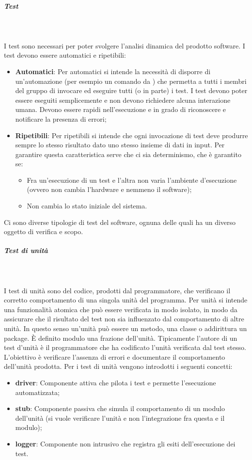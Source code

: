 \subparagraph{Test} \mbox{}\\ \\
I test sono necessari per poter svolgere l'analisi dinamica del prodotto software.
I test devono essere automatici e ripetibili:
\begin{itemize}
\item \textbf{Automatici}: Per automatici si intende la necessità di disporre di un'automazione (per esempio un comando da ) che permetta a tutti i membri del gruppo di invocare ed eseguire tutti (o in parte) i test.
I test devono poter essere eseguiti semplicemente e non devono richiedere alcuna interazione umana.
Devono essere rapidi nell’esecuzione e in grado di riconoscere e notificare la presenza di errori;
\item \textbf{Ripetibili}: Per ripetibili si intende che ogni invocazione di test deve produrre sempre lo stesso risultato dato uno stesso insieme di dati in input.
Per garantire questa caratteristica serve che ci sia determinismo, che è garantito se:
\begin{itemize}
    \item Fra un'esecuzione di un test e l'altra non varia l'ambiente d'esecuzione (ovvero non cambia l'hardware e nemmeno il software);
    \item Non cambia lo stato iniziale del sistema.
\end{itemize}
\end{itemize}
Ci sono diverse tipologie di test del software, ognuna delle quali ha un diverso oggetto di verifica e scopo.

\subparagraph{Test di unità} \mbox{}\\ \\
I test di unità sono del codice, prodotti dal programmatore, che verificano il corretto comportamento di una singola unità del programma.
Per unità si intende una funzionalità atomica che può essere verificata in modo isolato, in modo da assicurare che il risultato del test non sia influenzato dal comportamento di altre unità. In questo senso un'unità può essere un metodo, una classe o addirittura un package.
È definito modulo una frazione dell'unità.
Tipicamente l'autore di un test d'unità è il programmatore che ha codificato l'unità verificata dal test stesso.
L'obiettivo è verificare l’assenza di errori e documentare il comportamento dell’unità prodotta.
Per i test di unità vengono introdotti i seguenti concetti:
\begin{itemize}
    \item \textbf{driver}: Componente attiva che pilota i test e permette l'esecuzione automatizzata;
    \item \textbf{stub}: Componente passiva che simula il comportamento di un modulo dell'unità (si vuole verificare l'unità e non l'integrazione fra questa e il modulo);
    \item \textbf{logger}: Componente non intrusivo che registra gli esiti dell'esecuzione dei test.
\end{itemize}

